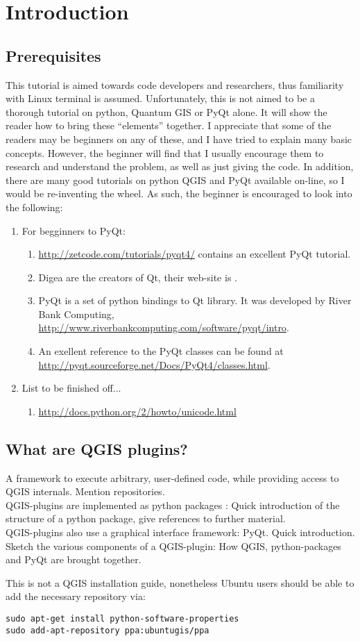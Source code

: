 \section{Introduction}
\label{sect:introduction}

\subsection{Prerequisites}
\label{ssect:prerequisites}
This tutorial is aimed towards code developers and researchers, thus familiarity with Linux terminal is assumed. Unfortunately, this is not aimed to be a thorough tutorial on python, Quantum GIS or PyQt alone. It will show the reader how to bring these ``elements'' together. I appreciate that some of the readers may be beginners on any of these, and I have tried to explain many basic concepts. However, the beginner will find that I usually encourage them to research and understand the problem, as well as just giving the code. In addition, there are many good tutorials on python QGIS and PyQt available on-line, so I would be re-inventing the wheel. As such, the beginner is encouraged to look into the following:
\begin{enumerate}
  \item For begginners to PyQt:
  \begin{enumerate}
    \item \url{http://zetcode.com/tutorials/pyqt4/} contains an excellent PyQt tutorial.
    \item Digea are the creators of Qt, their web-site is \url{}.
    \item PyQt is a set of python bindings to Qt library. It was developed by River Bank Computing, \url{http://www.riverbankcomputing.com/software/pyqt/intro}.
    \item An exellent reference to the PyQt classes can be found at \url{http://pyqt.sourceforge.net/Docs/PyQt4/classes.html}.
  \end{enumerate}
  \item List to be finished off...
  \begin{enumerate}
    \item \url{http://docs.python.org/2/howto/unicode.html}
  \end{enumerate}
\end{enumerate}

\subsection{What are QGIS plugins?}
\par
A framework to execute arbitrary, user-defined code, while providing access to QGIS internals. Mention repositories.\\
QGIS-plugins are implemented as python packages : Quick introduction of the structure of a python package, give references to further material.\\
QGIS-plugins also use a graphical interface framework: PyQt. Quick introduction.\\
Sketch the various components of a QGIS-plugin: How QGIS, python-packages and PyQt are brought together.

This is not a QGIS installation guide, nonetheless Ubuntu users should be able to add the necessary repository via:
\begin{lstlisting}
sudo apt-get install python-software-properties
sudo add-apt-repository ppa:ubuntugis/ppa
\end{lstlisting}
